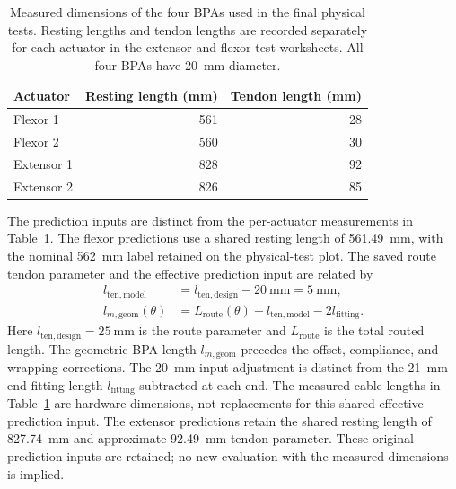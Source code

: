 \begin{table}[htbp]
\centering\small
\caption{Measured dimensions of the four BPAs used in the final physical tests. Resting lengths and tendon lengths are recorded separately for each actuator in the extensor and flexor test worksheets. All four BPAs have \qty{20}{\mm} diameter.}
\label{tab:final_test_dimensions}
\begin{tabular}{lrr}
\toprule
Actuator & Resting length (\unit{\mm}) & Tendon length (\unit{\mm}) \\
\midrule
Flexor 1 & 561 & 28 \\
Flexor 2 & 560 & 30 \\
Extensor 1 & 828 & 92 \\
Extensor 2 & 826 & 85 \\
\bottomrule
\end{tabular}
\end{table}

\FloatBarrier

The prediction inputs are distinct from the per-actuator measurements in Table~\ref{tab:final_test_dimensions}. The flexor predictions use a shared resting length of \qty{561.49}{\mm}, with the nominal \qty{562}{\mm} label retained on the physical-test plot. The saved route tendon parameter and the effective prediction input are related by
\begin{equation}
\begin{aligned}
l_{\mathrm{ten,model}} &= l_{\mathrm{ten,design}}-\qty{20}{\mm}=\qty{5}{\mm},\\
l_{m,\mathrm{geom}}(\theta) &= L_{\mathrm{route}}(\theta)-l_{\mathrm{ten,model}}-2l_{\mathrm{fitting}}.
\end{aligned}
\label{eq:app_flexor_tendon_inputs}
\end{equation}
Here $l_{\mathrm{ten,design}}=\qty{25}{\mm}$ is the route parameter and $L_{\mathrm{route}}$ is the total routed length. The geometric BPA length $l_{m,\mathrm{geom}}$ precedes the offset, compliance, and wrapping corrections. The \qty{20}{\mm} input adjustment is distinct from the \qty{21}{\mm} end-fitting length $l_{\mathrm{fitting}}$ subtracted at each end. The measured cable lengths in Table~\ref{tab:final_test_dimensions} are hardware dimensions, not replacements for this shared effective prediction input. The extensor predictions retain the shared resting length of \qty{827.74}{\mm} and approximate \qty{92.49}{\mm} tendon parameter. These original prediction inputs are retained; no new evaluation with the measured dimensions is implied.

